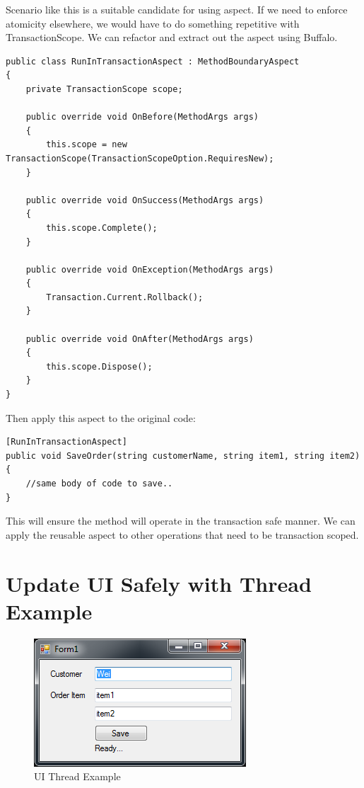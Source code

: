 Scenario like this is a suitable candidate for using aspect. If we need to enforce atomicity elsewhere, we would have to do something repetitive with TransactionScope. We can refactor and extract out the aspect using Buffalo.

\begin{lstlisting}[caption={RunInTransactionAspect}, label=transaspect, frame=tb, basicstyle=\scriptsize]
public class RunInTransactionAspect : MethodBoundaryAspect
{
	private TransactionScope scope;

	public override void OnBefore(MethodArgs args)
	{
		this.scope = new TransactionScope(TransactionScopeOption.RequiresNew);
	}

	public override void OnSuccess(MethodArgs args)
	{
		this.scope.Complete();
	}

	public override void OnException(MethodArgs args)
	{
		Transaction.Current.Rollback();
	}

	public override void OnAfter(MethodArgs args)
	{
		this.scope.Dispose();
	}
}
\end{lstlisting}

Then apply this aspect to the original code:
\begin{lstlisting}[caption={SaveOrder with Aspect}, label=saveorderwithaspect, frame=tb, basicstyle=\scriptsize]
[RunInTransactionAspect]
public void SaveOrder(string customerName, string item1, string item2)
{
	//same body of code to save..
}
\end{lstlisting}

This will ensure the method will operate in the transaction safe manner. We can apply the reusable aspect to other operations that need to be transaction scoped.

\section{Update UI Safely with Thread Example}

\begin{figure}[H]
  \includegraphics[scale=1.0]{Thread.PNG}
  \centering
  \caption{UI Thread Example\label{uithread}}
\end{figure}

